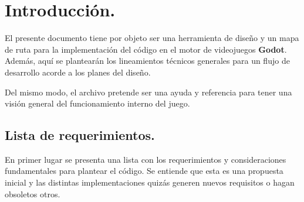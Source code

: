 
\section{Introducción.}\label{intro:introduccion}
El presente documento tiene por objeto ser una herramienta de diseño y un mapa de ruta para la implementación del código en el motor de videojuegos \textbf{Godot}. Además, aquí se plantearán los lineamientos técnicos generales para un flujo de desarrollo acorde a los planes del diseño.

Del mismo modo, el archivo pretende ser una ayuda y referencia para tener una visión general del funcionamiento interno del juego.

\subsection{Lista de requerimientos.}\label{intro:lista-de-requerimientos}
En primer lugar se presenta una lista con los requerimientos y consideraciones fundamentales para plantear el código. Se entiende que esta es una propuesta inicial y las distintas implementaciones quizás generen nuevos requisitos o hagan obsoletos otros.

